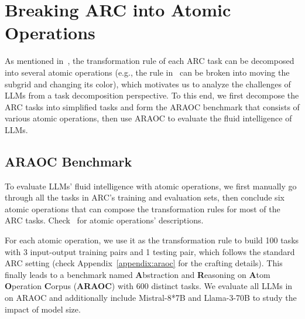 

\section{Breaking ARC into Atomic Operations}
\label{sec: atom operation}
As mentioned in~, the transformation rule of each ARC task can be decomposed into several atomic operations (e.g., the rule in~ can be broken into moving the subgrid and changing its color), which motivates us to analyze the challenges of LLMs from a task decomposition perspective. To this end, we first decompose the ARC tasks into simplified tasks and form the ARAOC benchmark that consists of various atomic operations, then use ARAOC to evaluate the fluid intelligence of LLMs.


\subsection{ARAOC Benchmark}


\label{sec:araoc benchmark}
To evaluate LLMs' fluid intelligence with atomic operations, we first manually go through all the tasks in ARC's training and evaluation sets, then conclude six atomic operations that can compose the transformation rules for most of the ARC tasks. Check~ for atomic operations' descriptions. 

For each atomic operation, we use it as the transformation rule to build 100 tasks with 3 input-output training pairs and 1 testing pair, which follows the standard ARC setting (check Appendix~\ref{appendix:araoc} for the crafting details). This finally leads to a benchmark named \textbf{A}bstraction and \textbf{R}easoning on \textbf{A}tom \textbf{O}peration  \textbf{C}orpus (\textbf{ARAOC}) with 600 distinct tasks. %
We evaluate all LLMs in~ on ARAOC and additionally include Mistral-8*7B and Llama-3-70B to study the impact of model size.




